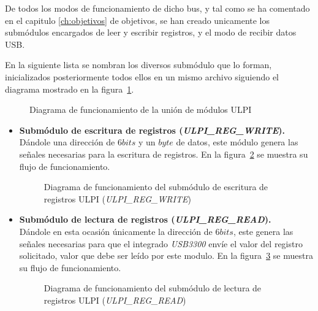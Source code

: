 De todos los modos de funcionamiento de dicho bus, y tal como se ha comentado en el capitulo \ref{ch:objetivos} de objetivos, se han creado unicamente los submódulos encargados de leer y escribir registros, y el modo de recibir datos USB.

En la siguiente lista se nombran los diversos submódulo que lo forman, inicializados posteriormente todos ellos en un mismo archivo siguiendo el diagrama mostrado en la figura~\ref{fig:flujo_ulpi_main}.

\begin{figure}[hbtp]
    \centering
    \scalebox{0.8} {}
    \caption{Diagrama de funcionamiento de la unión de módulos ULPI}
    \label{fig:flujo_ulpi_main}
\end{figure}

\begin{itemize}
    \item \textbf{Submódulo de escritura de registros (\emph{ULPI\_REG\_WRITE}).} \\
    Dándole una dirección de $6bits$ y un $byte$ de datos, este módulo genera las señales necesarias para la escritura de registros. En la figura~\ref{fig:flujo_ulpi_write} se muestra su flujo de funcionamiento.
    \begin{figure}[hbtp]
        \centering
        \scalebox{0.8} {}
        \caption{Diagrama de funcionamiento del submódulo de escritura de registros ULPI (\emph{ULPI\_REG\_WRITE})}
        \label{fig:flujo_ulpi_write}
    \end{figure}
    
    \item \textbf{Submódulo de lectura de registros (\emph{ULPI\_REG\_READ}).} \\
    Dándole en esta ocasión únicamente la dirección de $6bits$, este genera las señales necesarias para que el integrado \emph{USB3300} envíe el valor del registro solicitado, valor que debe ser leído por este modulo. En la figura~\ref{fig:flujo_ulpi_read} se muestra su flujo de funcionamiento.
    \begin{figure}[hbtp]
        \centering
        \scalebox{0.8} {}
        \caption{Diagrama de funcionamiento del submódulo de lectura de registros ULPI (\emph{ULPI\_REG\_READ})}
        \label{fig:flujo_ulpi_read}
    \end{figure}
    

\end{itemize}
